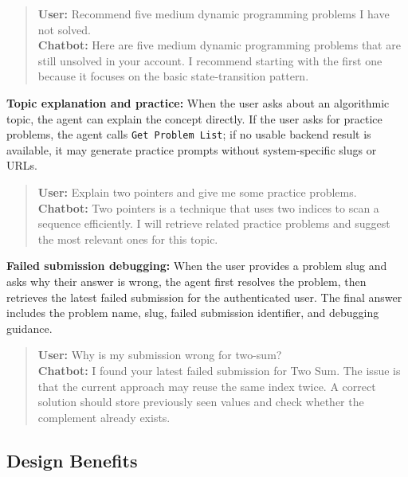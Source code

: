 \begin{quote}
\textbf{User:} Recommend five medium dynamic programming problems I have not solved.\\
\textbf{Chatbot:} Here are five medium dynamic programming problems that are still unsolved in your account. I recommend starting with the first one because it focuses on the basic state-transition pattern.
\end{quote}

\textbf{Topic explanation and practice:} When the user asks about an algorithmic topic, the agent can explain the concept directly. If the user asks for practice problems, the agent calls \texttt{Get Problem List}; if no usable backend result is available, it may generate practice prompts without system-specific slugs or URLs.

\begin{quote}
\textbf{User:} Explain two pointers and give me some practice problems.\\
\textbf{Chatbot:} Two pointers is a technique that uses two indices to scan a sequence efficiently. I will retrieve related practice problems and suggest the most relevant ones for this topic.
\end{quote}

\textbf{Failed submission debugging:} When the user provides a problem slug and asks why their answer is wrong, the agent first resolves the problem, then retrieves the latest failed submission for the authenticated user. The final answer includes the problem name, slug, failed submission identifier, and debugging guidance.

\begin{quote}
\textbf{User:} Why is my submission wrong for two-sum?\\
\textbf{Chatbot:} I found your latest failed submission for Two Sum. The issue is that the current approach may reuse the same index twice. A correct solution should store previously seen values and check whether the complement already exists.
\end{quote}

\subsection{Design Benefits}

